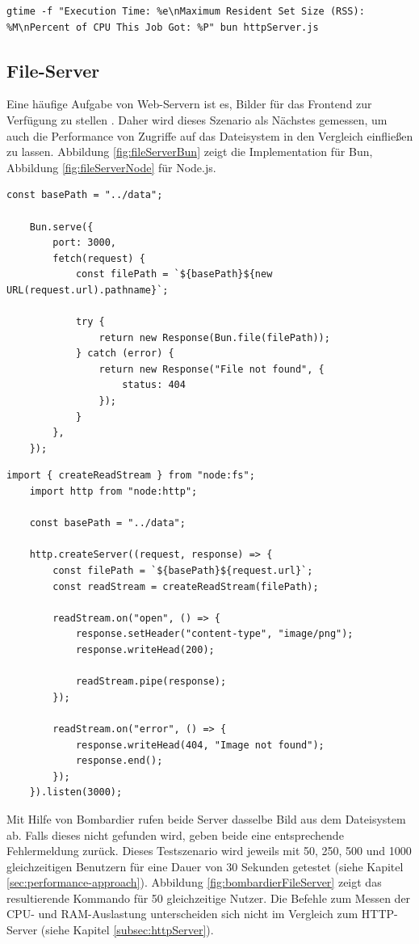 \begin{lstlisting}[caption={Bombardier HTTP-Server},label={fig:timeHTTPServerMacOS}]
	gtime -f "Execution Time: %e\nMaximum Resident Set Size (RSS): %M\nPercent of CPU This Job Got: %P" bun httpServer.js
\end{lstlisting}

\subsection{File-Server} \label{subsec:fileServer}
Eine häufige Aufgabe von Web-Servern ist es, Bilder für das Frontend zur Verfügung zu stellen . Daher wird dieses Szenario als Nächstes gemessen, um auch die Performance von Zugriffe auf das Dateisystem in den Vergleich einfließen zu lassen. \newline
Abbildung  \ref{fig:fileServerBun} zeigt die Implementation für Bun, Abbildung \ref{fig:fileServerNode} für Node.js.

\begin{lstlisting}[caption={File-Server Bun.js},label={fig:fileServerBun}]
	const basePath = "../data";
	
	Bun.serve({
		port: 3000,
		fetch(request) {
			const filePath = `${basePath}${new URL(request.url).pathname}`;
			
			try {
				return new Response(Bun.file(filePath));
			} catch (error) {
				return new Response("File not found", {
					status: 404
				});
			}
		},
	});
\end{lstlisting}

\begin{lstlisting}[caption={File-Server Node.js},label={fig:fileServerNode}]
	import { createReadStream } from "node:fs";
	import http from "node:http";
	
	const basePath = "../data";
	
	http.createServer((request, response) => {
		const filePath = `${basePath}${request.url}`;
		const readStream = createReadStream(filePath);
		
		readStream.on("open", () => {
			response.setHeader("content-type", "image/png");
			response.writeHead(200);
			
			readStream.pipe(response);
		});
		
		readStream.on("error", () => {
			response.writeHead(404, "Image not found");
			response.end();
		});
	}).listen(3000);
\end{lstlisting}

\noindent
Mit Hilfe von Bombardier rufen beide Server dasselbe Bild aus dem Dateisystem ab. Falls dieses nicht gefunden wird, geben beide eine entsprechende Fehlermeldung zurück. Dieses Testszenario wird jeweils mit 50, 250, 500 und 1000 gleichzeitigen Benutzern für eine Dauer von 30 Sekunden getestet (siehe Kapitel \ref{sec:performance-approach}). Abbildung  \ref{fig:bombardierFileServer} zeigt das resultierende Kommando für 50 gleichzeitige Nutzer. Die Befehle zum Messen der CPU- und RAM-Auslastung unterscheiden sich nicht im Vergleich zum HTTP-Server (siehe Kapitel \ref{subsec:httpServer}).

